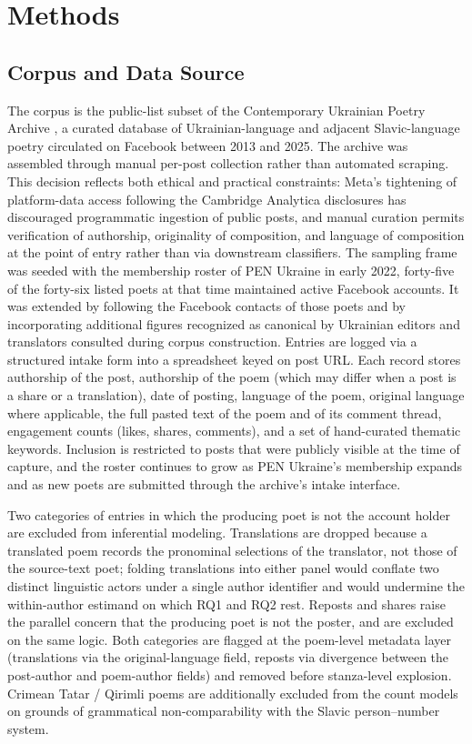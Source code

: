 \documentclass[12pt]{interact}
\theoremstyle{plain}%
\theoremstyle{definition}
\theoremstyle{remark}
\begin{document}
\section{Methods}
\label{sec:methods}

\subsection{Corpus and Data Source}

The corpus is the public-list subset of the Contemporary Ukrainian Poetry Archive \citep{glaser2024archive}, a curated database of Ukrainian-language and adjacent Slavic-language poetry circulated on Facebook between 2013 and 2025. The archive was assembled through manual per-post collection rather than automated scraping. This decision reflects both ethical and practical constraints: Meta's tightening of platform-data access following the Cambridge Analytica disclosures has discouraged programmatic ingestion of public posts, and manual curation permits verification of authorship, originality of composition, and language of composition at the point of entry rather than via downstream classifiers. The sampling frame was seeded with the membership roster of PEN Ukraine in early 2022,  forty-five of the forty-six listed poets at that time maintained active Facebook accounts. It was extended by following the Facebook contacts of those poets and by incorporating additional figures recognized as canonical by Ukrainian editors and translators consulted during corpus construction. Entries are logged via a structured intake form into a spreadsheet keyed on post URL. Each record stores authorship of the post, authorship of the poem (which may differ when a post is a share or a translation), date of posting, language of the poem, original language where applicable, the full pasted text of the poem and of its comment thread, engagement counts (likes, shares, comments), and a set of hand-curated thematic keywords. Inclusion is restricted to posts that were publicly visible at the time of capture, and the roster continues to grow as PEN Ukraine's membership expands and as new poets are submitted through the archive's intake interface.

Two categories of entries in which the producing poet is not the account holder are excluded from inferential modeling. Translations are dropped because a translated poem records the pronominal selections of the translator, not those of the source-text poet; folding translations into either panel would conflate two distinct linguistic actors under a single author identifier and would undermine the within-author estimand on which RQ1 and RQ2 rest. Reposts and shares raise the parallel concern that the producing poet is not the poster, and are excluded on the same logic. Both categories are flagged at the poem-level metadata layer (translations via the original-language field, reposts via divergence between the post-author and poem-author fields) and removed before stanza-level explosion. Crimean Tatar / Qirimli poems are additionally excluded from the count models on grounds of grammatical non-comparability with the Slavic person--number system.
\end{document}
